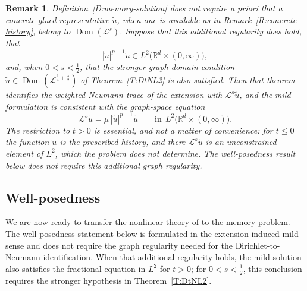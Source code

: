 \documentclass[11pt,letter]{amsart}
\newcommand{\Rd}{\mathbb R^d}
\numberwithin{equation}{section}
\newcommand{\Le}{\mathcal L}
\newcommand{\Dom}{\operatorname{Dom}}
\newtheorem{remark}[theorem]{Remark}
\numberwithin{equation}{section}
\begin{document}
\begin{remark}\label{R:graph-formulation}
Definition~\ref{D:memory-solution} does not require a priori that
a concrete glued representative $\widetilde u$, when one is available as in
Remark~\ref{R:concrete-history}, belong to \(\Dom(\Le^s)\). Suppose that this
additional regularity does hold, that
\[
|\widetilde u|^{p-1}\widetilde u\in L^2\bigl(\Rd\times(0,\infty)\bigr),
\]
and, when $0<s<\frac12$, that the stronger graph-domain condition
$\widetilde u\in\Dom(\Le^{\frac14+\frac s2})$ of Theorem~\ref{T:DtNL2} is also
satisfied. Then that theorem identifies the weighted Neumann trace of the
extension with \(\Le^s\widetilde u\), and the mild formulation is consistent
with the graph-space equation
\[
\Le^s\widetilde u=\mu\,|\widetilde u|^{p-1}\widetilde u
\qquad\text{in}\ \ L^2\bigl(\Rd\times(0,\infty)\bigr).
\]
The restriction to $t>0$ is essential, and not a matter of convenience: for
$t\le0$ the function $\widetilde u$ is the prescribed history, and there
$\Le^s\widetilde u$ is an unconstrained element of $L^2$, which the problem
does not determine. The well-posedness result below does not require this
additional graph regularity.
\end{remark}

\subsection{Well-posedness}

We are now ready to transfer the nonlinear theory of \cite{GS2} to
the memory problem. The well-posedness statement below is formulated in the
extension-induced mild sense and does not require the graph regularity needed
for the Dirichlet-to-Neumann identification. When that additional regularity
holds, the mild solution also satisfies the fractional equation in $L^2$ for
$t>0$; for $0<s<\frac12$, this conclusion requires the stronger hypothesis in
Theorem~\ref{T:DtNL2}.
\end{document}
